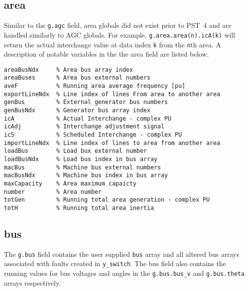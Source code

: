 \subsection{area} \label{ss: area globals} 
Similar to the \verb|g.agc| field, area globals did not exist prior to \mbox{PST 4} and are handled similarly to AGC globals.
For example, \verb|g.area.area(n).icA(k)| will return the actual interchange value at data index \verb|k| from the \verb|n|th area.
A description of notable variables in the the area field are listed below.
\begin{verbatim}
areaBusNdx     % Area bus array index
areaBuses      % Area bus external numbers
aveF           % Running area average frequency [pu]
exportLineNdx  % Line index of lines From area to another area
genBus         % External generator bus numbers
genBusNdx      % Generator bus array index
icA            % Actual Interchange - complex PU
icAdj          % Interchange adjustment signal
icS            % Scheduled Interchange - complex PU
importLineNdx  % Line index of lines to area from another area
loadBus        % Load bux external number
loadBusNdx     % Load bus index in bus array
macBus         % Machine bus external numbers
macBusNdx      % Machine bus index in bus array
maxCapacity    % Area maximum capaicty
number         % Area number
totGen         % Running total area generation - complex PU
totH           % Running total area inertia
\end{verbatim}

\subsection{bus}  
The \verb|g.bus| field contains the user supplied \verb|bus| array and all altered bus arrays associated with faults created in \verb|y_switch|.
The bus field also contains the running values for bus voltages and angles in the \verb|g.bus.bus_v| and \verb|g.bus.theta| arrays respectively.


